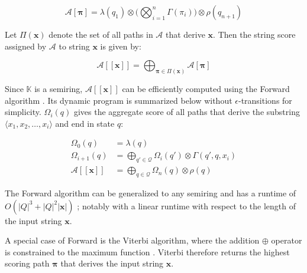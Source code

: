 \begin{equation}
  \mathcal{A}[\pmb{\pi}] = \lambda(q_1) \otimes \Bigg( \bigotimes_{i=1}^n \Gamma(\pi_i) \Bigg) \otimes \rho(q_{n+1})
\end{equation}

\begin{definition}
\label{def:string-score}
Let $\Pi(\pmb{x})$ denote the set of all paths in $\mathcal{A}$ that derive $\pmb{x}$. Then the string score assigned by $\mathcal{A}$ to string $\pmb{x}$ is given by:
  
\end{definition}

\begin{equation}
  \mathcal{A}[\![\pmb{x}]\!] = \bigoplus_{\pmb{\pi} \in \Pi(\pmb{x})} \mathcal{A}[\pmb{\pi}]
\end{equation}

\begin{remark}
  Since $\mathbb{K}$ is a semiring, $\mathcal{A}[\![\pmb{x}]\!]$ can be efficiently computed using the Forward algorithm \citep{baum1966statistical}. Its dynamic program is summarized below without $\epsilon$-transitions for simplicity. $\Omega_i(q)$ gives the aggregate score of all paths that derive the substring $\langle x_1, x_2, \dots, x_i \rangle$ and end in state $q$:
 
\begin{subequations}
  \begin{align}
    \Omega_0(q) &= \lambda(q) \\
    \Omega_{i+1}(q) &= \bigoplus_{q' \in \mathcal{Q}} \Omega_i(q') \otimes \Gamma(q',q,x_i)  \\
    \mathcal{A}[\![\pmb{x}]\!] &= \bigoplus_{q \in \mathcal{Q}} \Omega_n(q) \otimes \rho(q)
  \end{align}
\end{subequations}

\end{remark}

\begin{remark}
  \label{rmk:old-runtime}
  The Forward algorithm can be generalized to any semiring \citep{eisner2002parameter} and has a runtime of $O(|Q|^3 + |Q|^2|\pmb{x}|)$ \citep{schwartz2018sopa}; notably with a linear runtime with respect to the length of the input string $\pmb{x}$.
\end{remark}

\begin{remark}
  A special case of Forward is the Viterbi algorithm, where the addition $\oplus$ operator is constrained to the maximum function \citep{viterbi1967error}. Viterbi therefore returns the highest scoring path $\pmb{\pi}$ that derives the input string $\pmb{x}$.
\end{remark}


